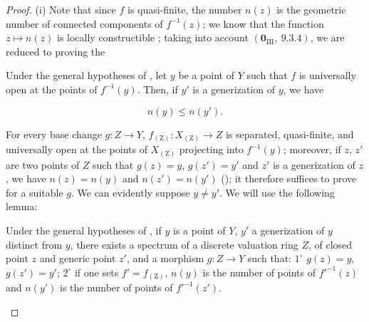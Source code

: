 \begin{proof}
(i)
Note that since $f$ is quasi-finite, the number $n(z)$ is the geometric number of connected components of $f^{-1}(z)$; we know that the function $z\mapsto n(z)$ is locally constructible ; taking into account $(\mathbf{0}_{\mathrm{III}},~9.3.4)$, we are reduced to proving the

\begin{corollary}[15.5.2]
\label{IV.15.5.2}
Under the general hypotheses of , let $y$ be a point of $Y$ such that $f$ is universally open at the points of $f^{-1}(y)$.
Then, if $y'$ is a generization of $y$, we have
\end{corollary}

\begin{equation}
\tag{15.5.2.1}
\label{IV.15.5.2.1}
  n(y) \leq n(y').
\end{equation}

For every base change $g:Z\to Y$, $f_{(\mathrm{Z})}:X_{(\mathrm{Z})}\to Z$ is separated, quasi-finite, and universally open at the points of $X_{(\mathrm{Z})}$ projecting into $f^{-1}(y)$; moreover, if $z$, $z'$ are two points of $Z$ such that $g(z)=y$, $g(z')=y'$ and $z'$ is a generization of $z$, we have $n(z)=n(y)$ and $n(z')=n(y')$ (); it therefore suffices to prove  for a suitable $g$.
We can evidently suppose $y\neq y'$.
We will use the following lemma:

\begin{lemma}[15.5.2.2]
\label{IV.15.5.2.2}
Under the general hypotheses of , if $y$ is a point of $Y$, $y'$ a generization of $y$ distinct from $y$, there exists a spectrum of a discrete valuation ring $Z$, of closed point $z$ and generic point $z'$, and a morphism $g:Z\to Y$ such that:
$1^\circ$ $g(z)=y$, $g(z')=y'$;
$2^\circ$ if one sets $f'=f_{(\mathrm{Z})}$, $n(y)$ is the number of points of $f'^{-1}(z)$ and $n(y')$ is the number of points of $f'^{-1}(z')$.
\end{lemma}


\end{proof}
